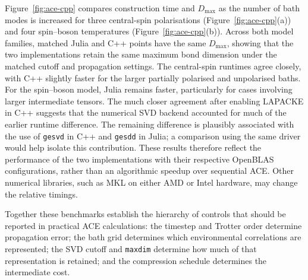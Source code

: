 Figure~\ref{fig:ace-cpp} compares construction time and \(D_{\max}\) as the number of bath modes is increased for three central-spin polarisations (Figure~\ref{fig:ace-cpp}(a)) and four spin--boson temperatures (Figure~\ref{fig:ace-cpp}(b)).
Across both model families, matched Julia and C++ points have the same \(D_{\max}\), showing that the two implementations retain the same maximum bond dimension under the matched cutoff and propagation settings.
The central-spin runtimes agree closely, with C++ slightly faster for the larger partially polarised and unpolarised baths.
For the spin--boson model, Julia remains faster, particularly for cases involving larger intermediate tensors.
The much closer agreement after enabling LAPACKE in C++ suggests that the numerical SVD backend accounted for much of the earlier runtime difference.
The remaining difference is plausibly associated with the use of \texttt{gesvd} in C++ and \texttt{gesdd} in Julia; a comparison using the same driver would help isolate this contribution.
These results therefore reflect the performance of the two implementations with their respective OpenBLAS configurations, rather than an algorithmic speedup over sequential ACE.
Other numerical libraries, such as MKL on either AMD or Intel hardware, may change the relative timings.

Together these benchmarks establish the hierarchy of controls that should be reported in practical ACE calculations: the timestep and Trotter order determine propagation error; the bath grid determines which environmental correlations are represented; the SVD cutoff and \texttt{maxdim} determine how much of that representation is retained; and the compression schedule determines the intermediate cost.